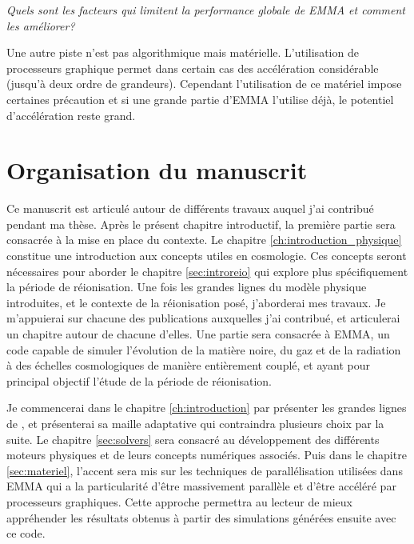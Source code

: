 \textit{Quels sont les facteurs qui limitent la performance globale de EMMA et comment les améliorer?}

Une autre piste n'est pas algorithmique mais matérielle.
L'utilisation de processeurs graphique permet dans certain cas des accélération considérable (jusqu’à deux ordre de grandeurs).
Cependant l'utilisation de ce matériel impose certaines précaution et si une grande partie d'EMMA l'utilise déjà, le potentiel d'accélération reste grand.






\section{Organisation du manuscrit}

Ce manuscrit est articulé autour de différents travaux auquel j'ai contribué pendant ma thèse.
Après le présent chapitre introductif, la première partie sera consacrée à la mise en place du contexte.
Le chapitre \ref{ch:introduction_physique} constitue une introduction aux concepts utiles en cosmologie.
Ces concepts seront nécessaires pour aborder le chapitre \ref{sec:introreio} qui explore plus spécifiquement la période de réionisation.
Une fois les grandes lignes du modèle physique introduites, et le contexte de la réionisation posé, j'aborderai mes travaux.
Je m'appuierai sur chacune des publications auxquelles j'ai contribué, et articulerai un chapitre autour de chacune d'elles. 
Une partie sera consacrée à EMMA, un code capable de simuler l'évolution de la matière noire, du gaz et de la radiation à des échelles cosmologiques de manière entièrement couplé, et ayant pour principal objectif l'étude de la période de réionisation.

Je commencerai dans le chapitre \ref{ch:introduction} par présenter les grandes lignes de \emma, et présenterai sa maille adaptative qui contraindra plusieurs choix par la suite.
Le chapitre \ref{sec:solvers} sera consacré au développement des différents moteurs physiques et de leurs concepts numériques associés.
Puis dans le chapitre \ref{sec:materiel}, l'accent sera mis sur les techniques de parallélisation utilisées dans EMMA qui a la particularité d'être massivement parallèle et d'être accéléré par processeurs graphiques.
Cette approche permettra au lecteur de mieux appréhender les résultats obtenus à partir des simulations générées ensuite avec ce code.

